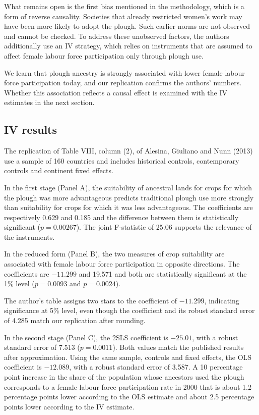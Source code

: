 \documentclass[12pt,a4paper]{article}
\begin{document}
What remains open is the first bias mentioned in the methodology, which is a form of reverse causality. Societies that already restricted women's work may have been more likely to adopt the plough. Such earlier norms are not observed and cannot be checked. To address these unobserved factors, the authors additionally use an IV strategy, which relies on instruments that are assumed to affect female labour force participation only through plough use.

We learn that plough ancestry is strongly associated with lower female labour force participation today, and our replication confirms the authors' numbers. Whether this association reflects a causal effect is examined with the IV estimates in the next section.

\subsection{IV results}

The replication of Table VIII, column (2), of Alesina, Giuliano and Nunn (2013) use a sample of 160 countries and includes historical controls, contemporary controls and continent fixed effects.

In the first stage (Panel A), the suitability of ancestral lands for crops for which the plough was more advantageous predicts traditional plough use more strongly than suitability for crops for which it was less advantageous. The coefficients are respectively 0.629 and 0.185 and the difference between them is statistically significant ($p=0.00267$). The joint F-statistic of 25.06 supports the relevance of the instruments.

In the reduced form (Panel B), the two measures of crop suitability are associated with female labour force participation in opposite directions. The coefficients are $-11.299$ and 19.571 and both are statistically significant at the 1\% level ($p=0.0093$ and $p=0.0024$).

The author's table assigns two stars to the coefficient of $-11.299$, indicating significance at 5\% level, even though the coefficient and its robust standard error of 4.285 match our replication after rounding.

In the second stage (Panel C), the 2SLS coefficient is $-25.01$, with a robust standard error of 7.513 ($p=0.0011$). Both values match the published results after approximation. Using the same sample, controls and fixed effects, the OLS coefficient is $-12.089$, with a robust standard error of 3.587. A 10 percentage point increase in the share of the population whose ancestors used the plough corresponds to a female labour force participation rate in 2000 that is about 1.2 percentage points lower according to the OLS estimate and about 2.5 percentage points lower according to the IV estimate.
\end{document}
